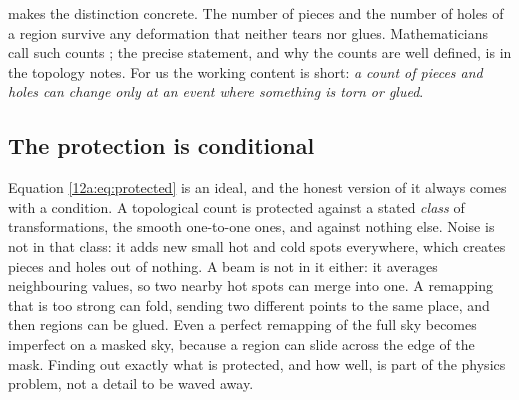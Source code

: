  makes the distinction concrete. The number of pieces and the number of holes of a
region survive any deformation that neither tears nor glues. Mathematicians call such counts
; the precise statement, and why the counts are well defined, is in the
topology notes. For us the working content is short: \emph{a count of pieces and holes can change only at an
event where something is torn or glued}.

\subsection{The protection is conditional}
\label{12a:sec:conditional}

Equation \eqref{12a:eq:protected} is an ideal, and the honest version of it always comes with a
condition. A topological count is protected against a stated \emph{class} of transformations, the smooth
one-to-one ones, and against nothing else. Noise is not in that class: it adds new small hot and cold spots
everywhere, which creates pieces and holes out of nothing. A beam is not in it either: it averages
neighbouring values, so two nearby hot spots can merge into one. A remapping that is too strong can fold,
sending two different points to the same place, and then regions can be glued. Even a perfect remapping
of the full sky becomes imperfect on a masked sky, because a region can slide across the edge of the mask.
Finding out exactly what is protected, and how well, is part of the physics problem, not a detail to be
waved away.

